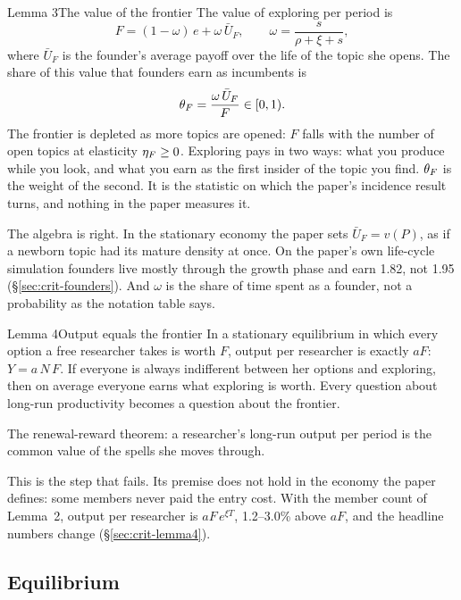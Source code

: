\begin{resultbox}{Lemma 3}{The value of the frontier}{\tsolid}
The value of exploring per period is
\[
F=(1-\omega)\,e+\omega\,\bar U_F,\qquad \omega=\frac{s}{\rho+\xi+s},
\]
where $\bar U_F$ is the founder's average payoff over the life of the topic she opens. The share of this value that founders earn as incumbents is
\[
\theta_F=\frac{\omega\,\bar U_F}{F}\in[0,1).
\]
The frontier is depleted as more topics are opened: $F$ falls with the number of open topics at elasticity $\eta_F\ge0$.
\tcblower
\inwords Exploring pays in two ways: what you produce while you look, and what you earn as the first insider of the topic you find. $\theta_F$ is the weight of the second. It is the statistic on which the paper's incidence result turns, and nothing in the paper measures it.

\review The algebra is right. In the stationary economy the paper sets $\bar U_F=v(P)$, as if a newborn topic had its mature density at once. On the paper's own life-cycle simulation founders live mostly through the growth phase and earn 1.82, not 1.95 (\S\ref{sec:crit-founders}). And $\omega$ is the share of time spent as a founder, not a probability as the notation table says.
\end{resultbox}

\begin{resultbox}{Lemma 4}{Output equals the frontier}{\trepair}
In a stationary equilibrium in which every option a free researcher takes is worth $F$, output per researcher is exactly $aF$: \quad $Y=a\,N\,F$.
\tcblower
\inwords If everyone is always indifferent between her options and exploring, then on average everyone earns what exploring is worth. Every question about long-run productivity becomes a question about the frontier.

\why The renewal-reward theorem: a researcher's long-run output per period is the common value of the spells she moves through.

\review This is the step that fails. Its premise does not hold in the economy the paper defines: some members never paid the entry cost. With the member count of Lemma~2, output per researcher is $aF\,e^{\xi T}$, 1.2--3.0\% above $aF$, and the headline numbers change (\S\ref{sec:crit-lemma4}).
\end{resultbox}

\subsection{Equilibrium}

